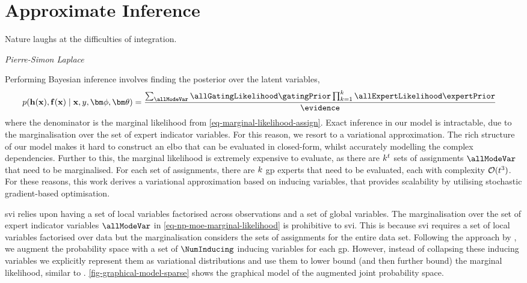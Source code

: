 \documentclass{mimosis-class/mimosis}
\numberwithin{equation}{chapter}
\newcommand{\numData}{\ensuremath{t}}
\newcommand{\modeInd}{\ensuremath{k}}
\newcommand{\NumData}{\ensuremath{\MakeUppercase{\numData}}}
\newcommand{\ModeInd}{\ensuremath{\MakeUppercase{\modeInd}}}
\newcommand{\allData}[1]{\ensuremath{\MakeUppercase{#1}}}
\newcommand{\x}{\ensuremath{\mathbf{x}}}
\newcommand{\y}{\ensuremath{y}}
\newcommand{\allInput}{\ensuremath{\allData{\x}}}
\newcommand{\allOutput}{\ensuremath{\allData{\y}}}
\newcommand{\gatingFunc}{\ensuremath{h}}
\newcommand{\GatingFunc}{\ensuremath{\mathbf{\gatingFunc}}}
\newcommand{\latentFunc}{\ensuremath{f}}
\newcommand{\LatentFunc}{\ensuremath{\mathbf{\latentFunc}}}
\newcommand{\gatingParams}{\ensuremath{\bm\phi}}
\newcommand{\expertParams}{\ensuremath{\bm\theta}}
\begin{document}
{\section{Approximate Inference \label{sec-inference}}
\label{sec:orgfd09708}
\epigraph{Nature laughs at the difficulties of integration.}{\textit{Pierre-Simon Laplace}}
Performing Bayesian inference involves finding the posterior over the latent variables,
\begin{align} \label{eq-}
p(\GatingFunc(\allInput), \LatentFunc(\allInput) \mid \allInput, \allOutput, \gatingParams, \expertParams)
&= \frac{\sum_{\allModeVar} \allGatingLikelihood \gatingPrior
\prod_{\modeInd=1}^{\ModeInd} \allExpertLikelihood \expertPrior}{\evidence}
\end{align}
where the denominator is the marginal likelihood from \cref{eq-marginal-likelihood-assign}.
Exact inference in our model is intractable, due to the marginalisation over the set of expert indicator variables.
For this reason, we resort to a variational approximation.
The rich structure of our model makes it hard to construct an \acrshort{elbo} that can
be evaluated in closed-form, whilst accurately modelling the complex dependencies.
Further to this, the marginal likelihood is extremely expensive to evaluate,
as there are \(\ModeInd^{\NumData}\) sets of assignments \(\allModeVar\) that need to be marginalised.
For each set of assignments, there are \(\ModeInd\) \acrshort{gp} experts that need to be evaluated, each with
complexity \(\mathcal{O}(\NumData^{3})\).
For these reasons, this work derives a variational approximation based on inducing variables, that provides scalability
by utilising stochastic gradient-based optimisation.

\acrfull{svi} \citep{hoffmanStochastic2013} relies upon having a set of local variables
factorised across observations and a set of global variables.
The marginalisation over the set of expert indicator variables \(\allModeVar\)
in \cref{eq-np-moe-marginal-likelihood} is prohibitive to \acrshort{svi}.
This is because \acrshort{svi} requires a set of local variables factorised over data but the
marginalisation considers the sets of assignments for the entire data set.
Following the approach by \cite{titsiasVariational2009}, we augment the probability space
with a set of \(\NumInducing\) inducing variables for each \acrshort{gp}.
However, instead of collapsing these inducing variables we explicitly
represent them as variational distributions and use them to lower bound
(and then further bound) the marginal likelihood, similar to
\cite{hensmanGaussian2013,hensmanScalable2015}.
\cref{fig-graphical-model-sparse} shows the graphical model of the augmented joint probability space.


}
\end{document}

